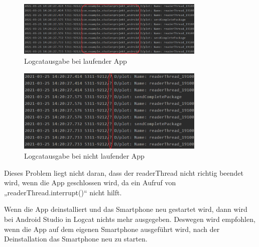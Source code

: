 \documentclass[12pt, onecolumn,notitlepage]{scrartcl}
\begin{document}
\begin{figure}[htbp] 
	\centering
	\includegraphics[width=0.8\textwidth]{Logcat_laufend.PNG}
	\caption{Logcatausgabe bei laufender App}
\end{figure}

\begin{figure}[htbp] 
	\centering
	\includegraphics[width=0.8\textwidth]{Logcat_nichtLaufend.PNG}
	\caption{Logcatausgabe bei nicht laufender App}
\end{figure}

Dieses Problem liegt nicht daran, dass der readerThread nicht richtig beendet wird, wenn die App geschlossen wird, da ein Aufruf von „readerThread.interrupt()“ nicht hilft.\par
Wenn die App deinstalliert und das Smartphone neu gestartet wird, dann wird bei Android Studio in Logcat nichts mehr ausgegeben. Deswegen wird empfohlen, wenn die App auf dem eigenen Smartphone ausgeführt wird, nach der Deinstallation das Smartphone neu zu starten. 
\end{document}
